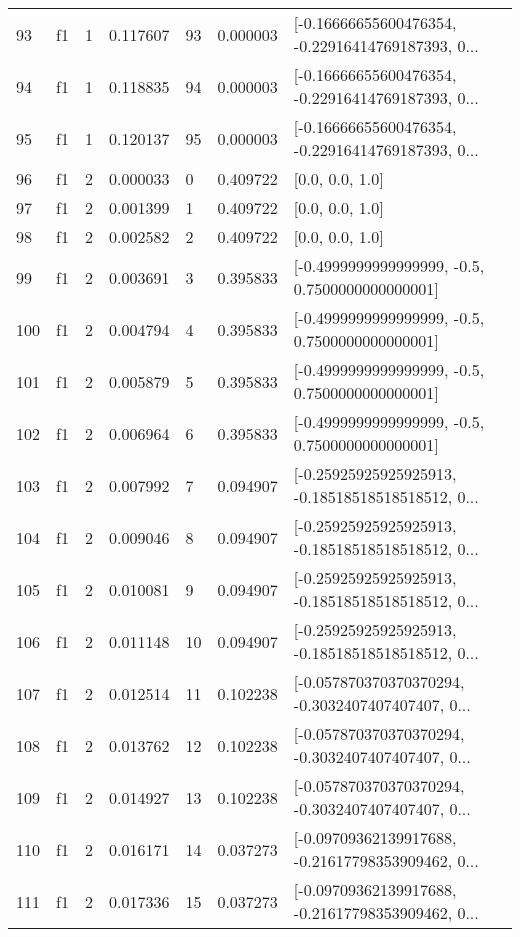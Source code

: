 \begin{tabular}{lllrlrl}
93  &  f1 &   1 &  0.117607 &   93 &  0.000003 &  [-0.16666655600476354, -0.22916414769187393, 0... \\
94  &  f1 &   1 &  0.118835 &   94 &  0.000003 &  [-0.16666655600476354, -0.22916414769187393, 0... \\
95  &  f1 &   1 &  0.120137 &   95 &  0.000003 &  [-0.16666655600476354, -0.22916414769187393, 0... \\
96  &  f1 &   2 &  0.000033 &    0 &  0.409722 &                                    [0.0, 0.0, 1.0] \\
97  &  f1 &   2 &  0.001399 &    1 &  0.409722 &                                    [0.0, 0.0, 1.0] \\
98  &  f1 &   2 &  0.002582 &    2 &  0.409722 &                                    [0.0, 0.0, 1.0] \\
99  &  f1 &   2 &  0.003691 &    3 &  0.395833 &    [-0.4999999999999999, -0.5, 0.7500000000000001] \\
100 &  f1 &   2 &  0.004794 &    4 &  0.395833 &    [-0.4999999999999999, -0.5, 0.7500000000000001] \\
101 &  f1 &   2 &  0.005879 &    5 &  0.395833 &    [-0.4999999999999999, -0.5, 0.7500000000000001] \\
102 &  f1 &   2 &  0.006964 &    6 &  0.395833 &    [-0.4999999999999999, -0.5, 0.7500000000000001] \\
103 &  f1 &   2 &  0.007992 &    7 &  0.094907 &  [-0.25925925925925913, -0.18518518518518512, 0... \\
104 &  f1 &   2 &  0.009046 &    8 &  0.094907 &  [-0.25925925925925913, -0.18518518518518512, 0... \\
105 &  f1 &   2 &  0.010081 &    9 &  0.094907 &  [-0.25925925925925913, -0.18518518518518512, 0... \\
106 &  f1 &   2 &  0.011148 &   10 &  0.094907 &  [-0.25925925925925913, -0.18518518518518512, 0... \\
107 &  f1 &   2 &  0.012514 &   11 &  0.102238 &  [-0.057870370370370294, -0.3032407407407407, 0... \\
108 &  f1 &   2 &  0.013762 &   12 &  0.102238 &  [-0.057870370370370294, -0.3032407407407407, 0... \\
109 &  f1 &   2 &  0.014927 &   13 &  0.102238 &  [-0.057870370370370294, -0.3032407407407407, 0... \\
110 &  f1 &   2 &  0.016171 &   14 &  0.037273 &  [-0.09709362139917688, -0.21617798353909462, 0... \\
111 &  f1 &   2 &  0.017336 &   15 &  0.037273 &  [-0.09709362139917688, -0.21617798353909462, 0... \\

\end{tabular}
